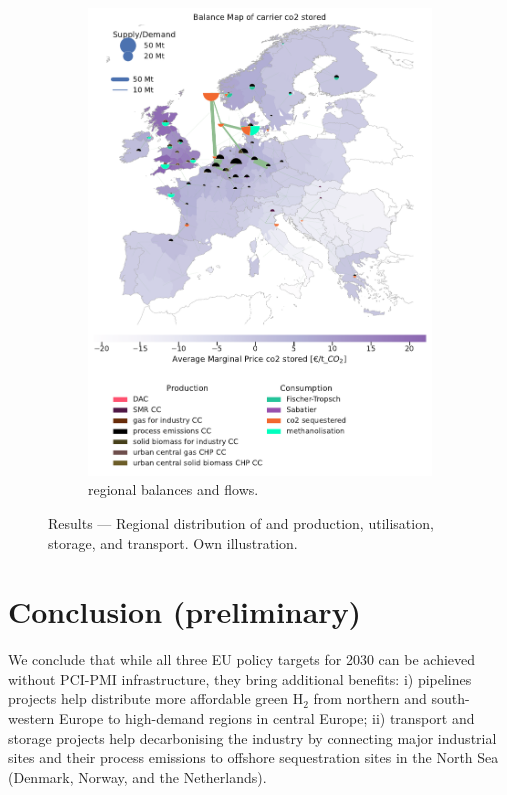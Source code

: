 \documentclass[10pt]{article}
\begin{document}
\begin{figure}[h!]
\begin{subfigure}[t]{0.495\textwidth}
        \includegraphics[width=\textwidth]{balance_map_co2} %
        \caption{ regional balances and flows.}
        \label{fig:balance_map_co2}
    \end{subfigure}
    \caption{Results --- Regional distribution of  and  production, utilisation, storage, and transport. Own illustration.}
    \label{fig:balance_maps}
\end{figure}

\section*{Conclusion (preliminary)}
We conclude that while all three EU policy targets for 2030 can be achieved without PCI-PMI infrastructure, they bring additional benefits: i)  pipelines projects help distribute more affordable green H$_2$ from northern and south-western Europe to high-demand regions in central Europe; ii)  transport and storage projects help decarbonising the industry by connecting major industrial sites and their process emissions to offshore sequestration sites in the North Sea (Denmark, Norway, and the Netherlands).
\end{document}
